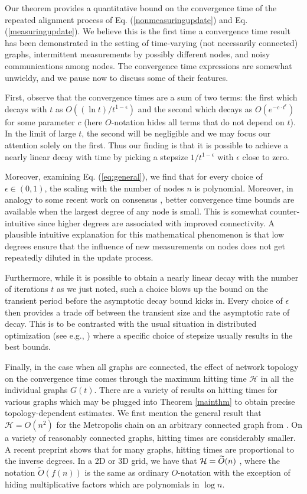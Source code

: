 \documentclass[final]{siamltex}
\begin{document}
Our theorem provides a quantitative bound on the convergence time of the repeated alignment process of Eq. (\ref{nonmeasuringupdate}) and Eq. (\ref{measuringupdate}). We believe this is the first time a convergence time result has been demonstrated in the setting of time-varying (not necessarily connected) graphs, 
intermittent measurements by possibly different nodes, and noisy communications among nodes. The convergence
time expressions are somewhat unwieldy, and we pause now to discuss some of their features. 

First, observe that the convergence times are a sum of two terms: the first which decays with $t$ as $O((\ln t)/t^{1-\epsilon})$ and the second which decays as 
$O(e^{-c \cdot t^{\epsilon}})$ for some parameter $c$ (here $O$-notation hides all terms that do not depend on $t$). In the limit of large $t$, the second will be negligible and we may focus 
our attention solely on the first. Thus our finding is that it is possible to achieve a nearly linear decay with time by picking a stepsize $1/t^{1-\epsilon}$ with
$\epsilon$ close to zero.

Moreover, examining Eq. (\ref{eq:general}), we find that for every choice of $\epsilon \in (0,1)$, the scaling with the number of nodes $n$ is polynomial.  Moreover, in analogy to some recent work on consensus \cite{noot09}, better convergence time bounds are available when the largest degree of any node is small. This is somewhat counter-intuitive  since higher degrees are associated with improved connectivity. A plausible intuitive explanation for this mathematical 
phenomenon is that low degrees ensure that the influence of new measurements on nodes does not get repeatedly diluted in the update process. 

Furthermore, while it is possible to obtain a nearly linear decay with the number of iterations $t$ as we just noted, such a 
choice blows up the bound on the transient period before the asymptotic decay bound kicks in. Every choice of $\epsilon$ then provides a trade off between the transient size and the asymptotic rate of decay. This is to be contrasted with the usual situation in distributed optimization (see e.g., \cite{ram-angelia, sn11}) where a specific choice of stepsize usually
results in the best bounds.  

Finally, in the case when all graphs are connected, the effect of network topology on the convergence time comes through the maximum hitting time $\mathcal{H}$ in all the 
individual graphs $G(t)$. There are a variety of results on hitting times for various graphs which may be plugged into Theorem \ref{mainthm} to obtain precise
topology-dependent estimates. We first mention the general result that $\mathcal{H} = O(n^2)$ for the Metropolis chain on an arbitrary connected graph from 
\cite{metropolis}. On a variety of reasonably connected graphs, hitting times are considerably smaller. A recent preprint \cite{luxburg} shows that for many graphs, hitting times are proportional to the inverse degrees. In a 2D or 3D grid, we have that ${\cal H} = \widetilde{O}(n)$ \cite{covertime}, where the notation $\widetilde{O}( f(n) )$ is the same as ordinary $O$-notation with the exception of hiding multiplicative factors which are polynomials in $\log n$. 
\end{document}
